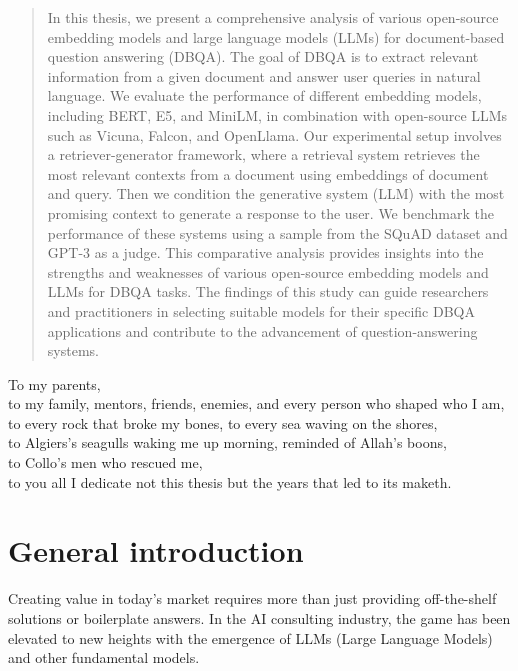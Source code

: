 \documentclass[a4paper,12pt]{article}
\begin{document}
\begin{abstract}
In this thesis, we present a comprehensive analysis of various open-source embedding models and large language models (LLMs) for document-based question answering (DBQA). The goal of DBQA is to extract relevant information from a given document and answer user queries in natural language. We evaluate the performance of different embedding models, including BERT, E5, and MiniLM, in combination with open-source LLMs such as Vicuna, Falcon, and OpenLlama.
Our experimental setup involves a retriever-generator framework, where a retrieval system retrieves the most relevant contexts from a document using embeddings of document and query. Then we condition the generative system (LLM) with the most promising context to generate a response to the user. 
We benchmark the performance of these systems using a sample from the SQuAD dataset and GPT-3 as a judge.
This comparative analysis provides insights into the strengths and weaknesses of various open-source embedding models and LLMs for DBQA tasks. 
The findings of this study can guide researchers and practitioners in selecting suitable models for their specific DBQA applications and contribute to the advancement of question-answering systems.
\end{abstract}

\clearpage
\begin{center}
	\thispagestyle{empty}
	\vspace*{\fill}
	To my parents,\\
	to my family, mentors, friends, enemies, and every person who shaped who I am, \\
	to every rock that broke my bones, to every sea waving on the shores, \\  
	to Algiers's seagulls waking me up morning, reminded of Allah's boons,\\
	to Collo's men who rescued me,\\
	to you all I dedicate not this thesis but the years that led to its maketh.\\
	\vspace*{\fill}
\end{center}
\clearpage


\onecolumn
\tableofcontents
\listoffigures
\listoftables

\newpage
\glsaddall
\printnoidxglossary[type=acronym, nonumberlist]

\newpage
\section{General introduction}
Creating value in today's market requires more than just providing off-the-shelf solutions or boilerplate answers. 
In the AI consulting industry, the game has been elevated to new heights with the emergence of LLMs (Large Language Models) and other fundamental models. 
\end{document}
